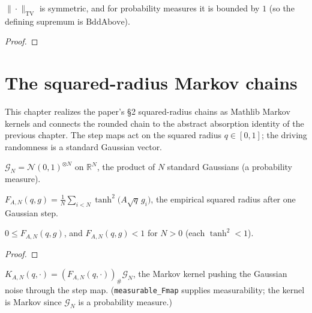 \begin{lemma}
  \label{lem:tv-metric}
  \leanok
  $\|\cdot\|_{\mathrm{TV}}$ is symmetric, and for probability measures it is bounded
  by $1$ (so the defining supremum is $\mathrm{BddAbove}$).
\end{lemma}
\begin{proof}\leanok{}\end{proof}

\chapter{The squared-radius Markov chains}

This chapter realizes the paper's §2 squared-radius chains as Mathlib Markov kernels
and connects the rounded chain to the abstract absorption identity of the previous
chapter. The step maps act on the squared radius $q\in[0,1]$; the driving randomness
is a standard Gaussian vector.

\begin{definition}
  \label{def:gaussianVec}
  \leanok
  $\mathcal G_N = \mathcal N(0,1)^{\otimes N}$ on $\mathbb R^N$, the product of $N$
  standard Gaussians (a probability measure).
\end{definition}

\begin{definition}
  \label{def:Fmap}
  \leanok
  $F_{A,N}(q,g) = \tfrac1N\sum_{i<N}\tanh^2\!\big(A\sqrt q\,g_i\big)$, the empirical
  squared radius after one Gaussian step.
\end{definition}

\begin{lemma}[Step map takes values in $[0,1)$]
  \label{lem:Fmap-range}
  \leanok
  $0 \le F_{A,N}(q,g)$, and $F_{A,N}(q,g) < 1$ for $N>0$ (each $\tanh^2 < 1$).
\end{lemma}
\begin{proof}\leanok{}\end{proof}

\begin{definition}
  \label{def:Kchain}
  \leanok
  $K_{A,N}(q,\cdot) = (F_{A,N}(q,\cdot))_\#\mathcal G_N$, the Markov kernel pushing the
  Gaussian noise through the step map. (\texttt{measurable\_Fmap} supplies
  measurability; the kernel is Markov since $\mathcal G_N$ is a probability measure.)
\end{definition}

